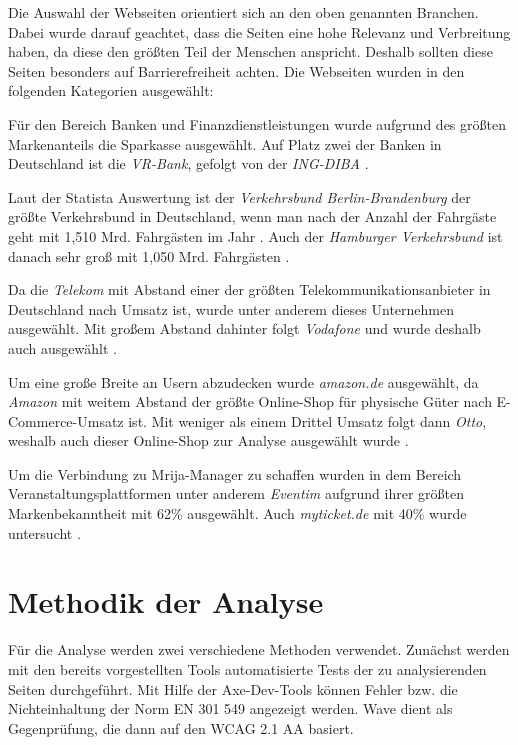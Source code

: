 Die Auswahl der Webseiten orientiert sich an den oben genannten Branchen. Dabei wurde darauf geachtet, dass die Seiten eine hohe Relevanz und Verbreitung haben, da diese den größten Teil der Menschen anspricht. Deshalb sollten diese Seiten besonders auf Barrierefreiheit achten. Die Webseiten wurden in den folgenden Kategorien ausgewählt:

Für den Bereich Banken und Finanzdienstleistungen wurde aufgrund des größten Markenanteils die Sparkasse ausgewählt. Auf Platz zwei der Banken in Deutschland ist die \textit{VR-Bank}, gefolgt von der \textit{ING-DIBA} \parencite[vgl.][]{bankblog_banken_2022}.

Laut der Statista Auswertung ist der \textit{Verkehrsbund Berlin-Brandenburg} der größte Verkehrsbund in Deutschland, wenn man nach der Anzahl der Fahrgäste geht \parencite[vgl.][]{statista_personennahverkehr_2023} mit 1,510 Mrd. Fahrgästen im Jahr \parencite[vgl.][]{vbb_fahrgaeste_2023}. Auch der \textit{Hamburger Verkehrsbund} ist danach sehr groß mit 1,050 Mrd. Fahrgästen \parencite[vgl.][]{hvv_fahrgaeste_2023}.

Da die \textit{Telekom} mit Abstand einer der größten Telekommunikationsanbieter in Deutschland nach Umsatz ist, wurde unter anderem dieses Unternehmen ausgewählt. Mit großem Abstand dahinter folgt \textit{Vodafone} und wurde deshalb auch ausgewählt \parencite[vgl.][]{dslweb_telekommunkationsdienste_2025}.

Um eine große Breite an Usern abzudecken wurde \textit{amazon.de} ausgewählt, da \textit{Amazon} mit weitem Abstand der größte Online-Shop für physische Güter nach E-Commerce-Umsatz ist. Mit weniger als einem Drittel Umsatz folgt dann \textit{Otto}, weshalb auch dieser Online-Shop zur Analyse ausgewählt wurde \parencite[vgl.][]{statista_onlineshops_2024}. 

Um die Verbindung zu Mrija-Manager zu schaffen wurden in dem Bereich Veranstaltungsplattformen unter anderem \textit{Eventim} aufgrund ihrer größten Markenbekanntheit mit 62\% ausgewählt. Auch \textit{myticket.de} mit 40\% wurde untersucht \parencite[vgl.][]{statista_veranstaltungsanbieter_2022}.

\section{Methodik der Analyse}
Für die Analyse werden zwei verschiedene Methoden verwendet. Zunächst werden mit den bereits vorgestellten Tools automatisierte Tests der zu analysierenden Seiten durchgeführt. Mit Hilfe der Axe-Dev-Tools können Fehler bzw. die Nichteinhaltung der Norm EN 301 549 angezeigt werden. Wave dient als Gegenprüfung, die dann auf den WCAG 2.1 AA basiert.

